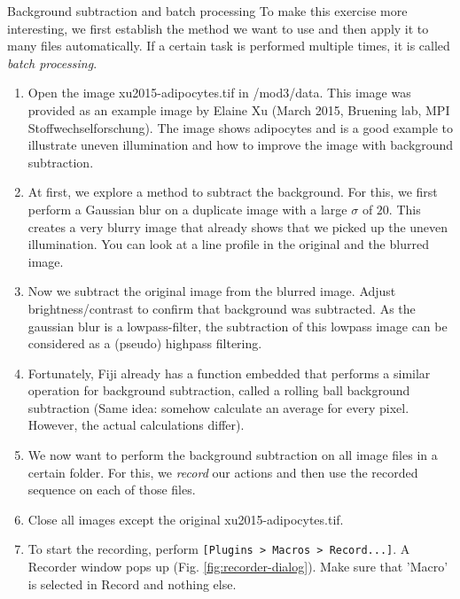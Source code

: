 \begin{taskbox}{Background subtraction and batch processing}
To make this exercise more interesting, we first establish the method we want to use and then apply it to many files automatically. If a certain task is performed multiple times, it is called \emph{batch processing}. 

\begin{enumerate}
	\item Open the image xu2015-adipocytes.tif in /mod3/data. This image was provided as an example image by Elaine Xu (March 2015, Bruening lab, MPI Stoffwechselforschung). The image shows adipocytes and is a good example to illustrate uneven illumination and how to improve the image with background subtraction.
	\item At first, we explore a method to subtract the background. For this, we first perform a Gaussian blur on a duplicate image with a large $\sigma$ of $20$. This creates a very blurry image that already shows that we picked up the uneven illumination. You can look at a line profile in the original and the blurred image.
	\item Now we subtract the original image from the blurred image. Adjust brightness/contrast to confirm that background was subtracted. As the gaussian blur is a lowpass-filter, the subtraction of this lowpass image can be considered as a (pseudo) highpass filtering.
	\item Fortunately, Fiji already has a function embedded that performs a similar operation for background subtraction, called a rolling ball background subtraction (Same idea: somehow calculate an average for every pixel. However, the actual calculations differ). 
	\item We now want to perform the background subtraction on all image files in a certain folder. For this, we \emph{record} our actions and then use the recorded sequence on each of those files.
	\item Close all images except the original xu2015-adipocytes.tif.
	\item To start the recording, perform \texttt{[Plugins > Macros > Record...]}. A Recorder window pops up (Fig. \ref{fig:recorder-dialog}). Make sure that 'Macro' is selected in Record and nothing else.
	
	\begin{minipage}[t]{\linewidth}
		\begin{center}
		\medskip
		\label{fig:recorder-dialog}
		\end{center}
	\end{minipage}
	

\end{enumerate}
\end{taskbox}
